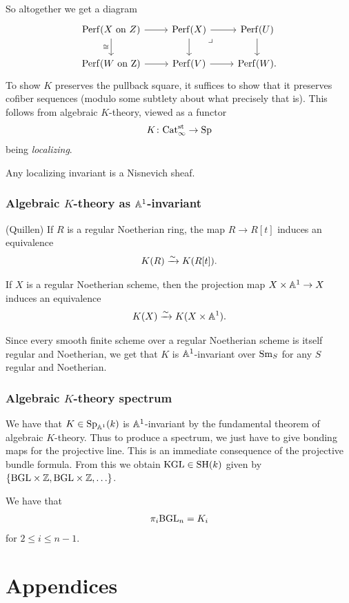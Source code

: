 \documentclass[11pt,openany]{book}
\begin{document}
So altogether we get a diagram
\[ \begin{tikzcd}
    \Perf(X\text{ on }Z)\rar\dar["\cong" left] & \Perf(X)\rar\dar\pb & \Perf(U)\dar\\
    \Perf(W\text{ on Z})\rar & \Perf(V)\rar & \Perf(W).
\end{tikzcd} \]
To show $K$ preserves the pullback square, it suffices to show that it preserves cofiber sequences (modulo some subtlety about what precisely that is). This follows from algebraic $K$-theory, viewed as a functor
\begin{align*}
    K \colon \mathrm{Cat}_\infty^{\mathrm{st}} \to \mathrm{Sp}
\end{align*}
being \textit{localizing}.

\begin{corollary} Any localizing invariant is a Nisnevich sheaf.
\end{corollary}

\subsection{Algebraic $K$-theory as $\mathbb{A}^1$-invariant}

\begin{theorem} \cite[p.~38]{Quillen} (Quillen) If $R$ is a regular Noetherian ring, the map $R \to R[t]$ induces an equivalence
\begin{align*}
    K(R) \xrightarrow{\sim} K(R[t]).
\end{align*}
\end{theorem}

\begin{theorem} \cite[6.8]{TT} If $X$ is a regular Noetherian scheme, then the projection map $X \times \mathbb{A}^1 \to X$ induces an equivalence
\begin{align*}
    K(X) \xrightarrow{\sim} K(X \times \mathbb{A}^1).
\end{align*}
\end{theorem}

Since every smooth finite scheme over a regular Noetherian scheme is itself regular and Noetherian, we get that $K$ is $\mathbb{A}^1$-invariant over $\mathrm{Sm}_S$ for any $S$ regular and Noetherian.

\subsection{Algebraic $K$-theory spectrum}


We have that $K \in \mathrm{Sp}_{\mathbb{A}^1}(k)$ is $\mathbb{A}^1$-invariant by the fundamental theorem of algebraic $K$-theory. Thus to produce a spectrum, we just have to give bonding maps for the projective line. This is an immediate consequence of the projective bundle formula. From this we obtain $\mathrm{KGL} \in \mathrm{SH}(k)$ given by $\left\{ \mathrm{BGL} \times \mathbb{Z}, \mathrm{BGL} \times \mathbb{Z}, \ldots \right\}$.


\begin{corollary} \cite[6.15]{AE}
We have that
\begin{align*}
    \pi_i \mathrm{BGL}_n = K_i
\end{align*}
for $2\le i\le n-1$.
\end{corollary}




\chapter{Appendices}




\printbibliography
\end{document}
